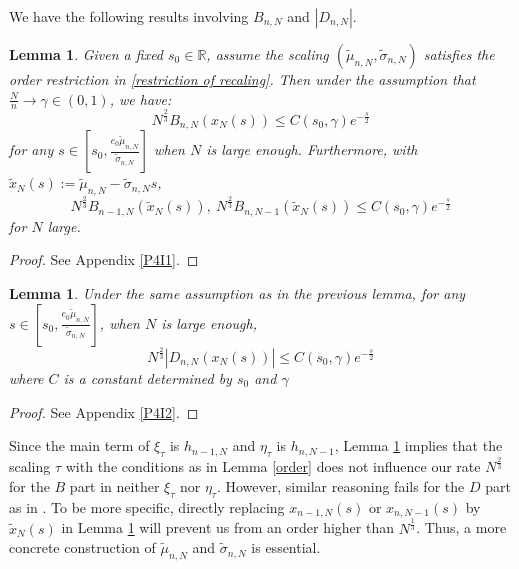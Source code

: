 \documentclass[11pt]{article}
\newtheorem{lemma}[theorem]{Lemma}
\numberwithin{equation}{section}%
\numberwithin{theorem}{section}
\begin{document}
We have the following results involving $B_{n,N}$ and $|D_{n,N}|$.
\begin{lemma}\label{keyI}
    Given a fixed $s_0\in\mathbb{R}$, assume the scaling $(\tilde{\mu}_{n,N},\tilde\sigma_{n,N})$ satisfies the order restriction in \eqref{restriction of recaling}. Then under the assumption that $\frac{N}{n}\rightarrow\gamma\in(0,1)$, we have:
    \begin{equation*}
        N^{\frac{2}{3}}B_{n,N}(x_N(s))\le C(s_0,\gamma)e^{-\frac{s}{2}}
    \end{equation*}
    for any $s\in\left[s_0,\frac{e_0\tilde{\mu}_{n,N}}{\tilde{\sigma}_{n,N}}\right]$ when $N$ is large enough. Furthermore, with  $\tilde{x}_N(s):=\tilde{\mu}_{n,N}-\tilde{\sigma}_{n,N}s$,
    \begin{equation*}
        N^{\frac{2}{3}}B_{n-1,N}(\tilde{x}_N(s)),~N^{\frac{2}{3}}B_{n,N-1}(\tilde{x}_N(s))\le C(s_0,\gamma)e^{-\frac{s}{2}}
    \end{equation*}
    for $N$ large.
\end{lemma}
\begin{proof}
   See Appendix \ref{P4I1}. 
\end{proof}

\begin{lemma}\label{keyI2}
    Under the same assumption as in the previous lemma, for any $s\in\left[s_0,\frac{e_0\tilde{\mu}_{n,N}}{\tilde{\sigma}_{n,N}}\right]$, when $N$ is large enough,
    \begin{equation*}
        N^{\frac{2}{3}}|D_{n,N}(x_N(s))|\le C(s_0,\gamma)e^{-\frac{s}{2}}
    \end{equation*}
    where $C$ is a constant determined by $s_0$ and $\gamma$
    \end{lemma}
 \begin{proof}
   See Appendix \ref{P4I2}.  
 \end{proof}
Since the main term of $\xi_\tau$ is $h_{n-1,N}$ and $\eta_\tau$ is $h_{n,N-1}$, Lemma \ref{keyI} implies that the scaling $\tau$ with the conditions as in Lemma \ref{order} does not influence our rate $N^\frac{2}{3}$ for the $B$ part in neither $\xi_{\tau}$ nor $\eta_{\tau}$. However, similar reasoning fails for the $D$ part as in \cite[Section $3.4.2$ ]{el2006rate}. To be more specific, directly replacing $x_{n-1,N}(s)$ or $x_{n,N-1}(s)$ by $\tilde{x}_N(s)$ in Lemma \ref{keyI2} will prevent us from an order higher than $N^\frac{1}{3}$. Thus, a more concrete construction of $\tilde{\mu}_{n,N}$ and $\tilde{\sigma}_{n,N}$ is essential.
\end{document}
